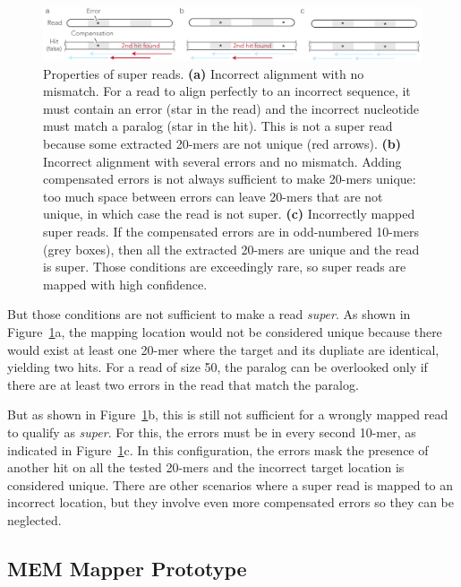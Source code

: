 \documentclass[english]{article}
\begin{document}
\begin{figure}[h]
\begin{center}
\includegraphics[scale=.63]{super_reads.pdf}
\end{center}
\caption{Properties of super reads. \textbf{(a)} Incorrect alignment with
no mismatch. For a read to align perfectly to an incorrect sequence, it
must contain an error (star in the read) and the incorrect nucleotide must
match a paralog (star in the hit). This is not a super read because some
extracted 20-mers are not unique (red arrows). \textbf{(b)} Incorrect
alignment with several errors and no mismatch. Adding compensated errors
is not always sufficient to make 20-mers unique: too much space between
errors can leave 20-mers that are not unique, in which case the read is
not super. \textbf{(c)} Incorrectly mapped super reads. If the compensated
errors are in odd-numbered 10-mers (grey boxes), then all the extracted
20-mers are unique and the read is super. Those conditions are exceedingly
rare, so super reads are mapped with high confidence.}
\label{fig_supread}
\end{figure}

But those conditions are not sufficient to make a read \emph{super}. As
shown in Figure~\ref{fig_supread}a, the mapping location would not be
considered unique because there would exist at least one 20-mer where the
target and its dupliate are identical, yielding two hits. For a read of
size 50, the paralog can be overlooked only if there are at least two
errors in the read that match the paralog.

But as shown in Figure~\ref{fig_supread}b, this is still not sufficient
for a wrongly mapped read to qualify as \emph{super}. For this, the errors
must be in every second 10-mer, as indicated in Figure~\ref{fig_supread}c.
In this configuration, the errors mask the presence of another hit on all
the tested 20-mers and the incorrect target location is considered unique.
There are other scenarios where a super read is mapped to an incorrect
location, but they involve even more compensated errors so they can be
neglected.


\subsection{MEM Mapper Prototype}
\end{document}
